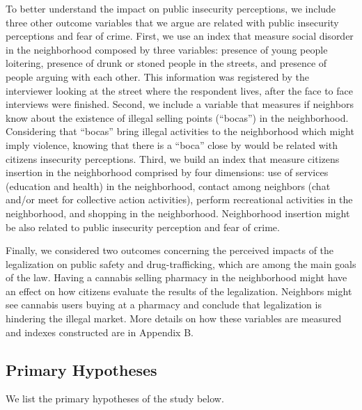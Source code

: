 \documentclass[11pt]{article}
\begin{document}
To better understand the impact on public insecurity perceptions, we include three other outcome variables that we argue are related with public insecurity perceptions and fear of crime. First, we use an index that measure social disorder in the neighborhood composed by three variables: presence of young people loitering, presence of drunk or stoned people in the streets, and presence of people arguing with each other. This information was registered by the interviewer looking at the street where the respondent lives, after the face to face interviews were finished. Second, we include a variable that measures if neighbors know about the existence of illegal selling points (``bocas'') in the neighborhood. Considering that ``bocas'' bring illegal activities to the neighborhood which might imply violence, knowing that there is a ``boca'' close by would be related with citizens insecurity perceptions. Third, we build an index that measure citizens insertion in the neighborhood comprised by four dimensions: use of services (education and health) in the neighborhood, contact among neighbors (chat and/or meet for collective action activities), perform recreational activities in the neighborhood, and shopping in the neighborhood. Neighborhood insertion might be also related to public insecurity perception and fear of crime.

Finally, we considered two outcomes concerning the perceived impacts of the legalization on public safety and drug-trafficking, which are among the main goals of the law. Having a cannabis selling pharmacy in the neighborhood might have an effect on how citizens evaluate the results of the legalization. Neighbors might see cannabis users buying at a pharmacy and conclude that legalization is hindering the illegal market. More details on how these variables are measured and indexes constructed are in Appendix B.

\subsection{Primary Hypotheses}
We list the primary hypotheses of the study below.
\end{document}
